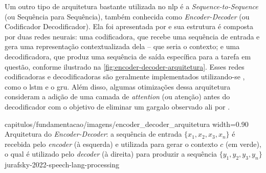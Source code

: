 



Um outro tipo de arquitetura bastante utilizada no \acrshort{nlp} é a \textit{Sequence-to-Sequence} (ou Sequência para Sequência), também conhecida como \textit{Encoder-Decoder} (ou Codificador Decodificador). Ela foi apresentada por  e sua estrutura é composta por duas redes neurais: uma codificadora, que recebe uma sequência de entrada e gera uma representação contextualizada dela -- que seria o contexto; e uma decodificadora, que produz uma sequência de saída específica para a tarefa em questão, conforme ilustrado na \autoref{fig:encoder-decoder-arquitetura}. 
Esses redes codificadoras e decodificadoras são geralmente implementados utilizando-se , como o \acrshort{lstm} e o \acrshort{gru}. Além disso, algumas otimizações dessa arquitetura consideram a adição de uma camada de \textit{attention} (ou atenção) antes do decodificador com o objetivo de eliminar um gargalo observado ali por .

{capitulos/fundamentacao/imagens/encoder_decoder_arquitetura}
{width=0.90\textwidth}
{Arquitetura do \textit{Encoder-Decoder}: a sequência de entrada \(\{x_1, x_2, x_3, x_n\}\) é recebida pelo \textit{encoder} (à esquerda) e utilizada para gerar o contexto \(c\) (em verde), o qual é utilizado pelo \textit{decoder} (à direita) para produzir a sequência \(\{y_1, y_2, y_3, y_n\}\)}
{jurafsky-2022-speech-lang-processing}

